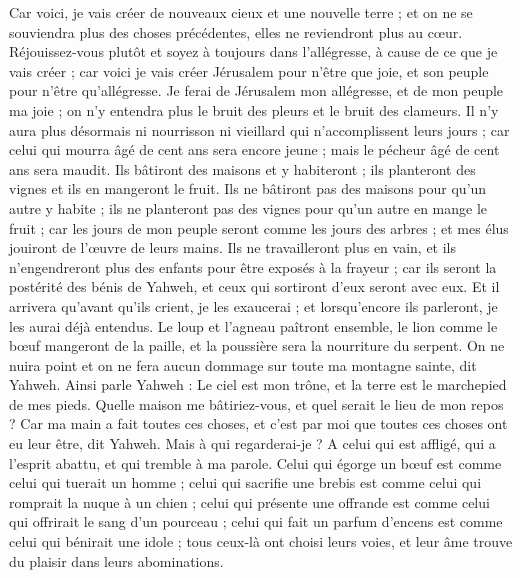 \begin{multicols}{2}
Car voici, je vais créer de nouveaux cieux et une nouvelle terre ; et on ne se souviendra plus des choses précédentes, elles ne reviendront plus au cœur.
Réjouissez-vous plutôt et soyez à toujours dans l'allégresse, à cause de ce que je vais créer ; car voici je vais créer Jérusalem pour n'être que joie, et son peuple pour n'être qu'allégresse.
Je ferai de Jérusalem mon allégresse, et de mon peuple ma joie ; on n'y entendra plus le bruit des pleurs et le bruit des clameurs.
Il n'y aura plus désormais ni nourrisson ni vieillard qui n'accomplissent leurs jours ; car celui qui mourra âgé de cent ans sera encore jeune ; mais le pécheur âgé de cent ans sera maudit.
Ils bâtiront des maisons et y habiteront ; ils planteront des vignes et ils en mangeront le fruit.
Ils ne bâtiront pas des maisons pour qu'un autre y habite ; ils ne planteront pas des vignes pour qu'un autre en mange le fruit ; car les jours de mon peuple seront comme les jours des arbres ; et mes élus jouiront de l'œuvre de leurs mains.
Ils ne travailleront plus en vain, et ils n'engendreront plus des enfants pour être exposés à la frayeur ; car ils seront la postérité des bénis de Yahweh, et ceux qui sortiront d'eux seront avec eux.
Et il arrivera qu'avant qu'ils crient, je les exaucerai ; et lorsqu'encore ils parleront, je les aurai déjà entendus.
Le loup et l'agneau paîtront ensemble, le lion comme le bœuf mangeront de la paille, et la poussière sera la nourriture du serpent. On ne nuira point et on ne fera aucun dommage sur toute ma montagne sainte, dit Yahweh.
\VerseOne{}Ainsi parle Yahweh : Le ciel est mon trône, et la terre est le marchepied de mes pieds. Quelle maison me bâtiriez-vous, et quel serait le lieu de mon repos ?
Car ma main a fait toutes ces choses, et c'est par moi que toutes ces choses ont eu leur être, dit Yahweh. Mais à qui regarderai-je ? A celui qui est affligé, qui a l'esprit abattu, et qui tremble à ma parole.
Celui qui égorge un bœuf est comme celui qui tuerait un homme ; celui qui sacrifie une brebis est comme celui qui romprait la nuque à un chien ; celui qui présente une offrande est comme celui qui offrirait le sang d'un pourceau ; celui qui fait un parfum d'encens est comme celui qui bénirait une idole ; tous ceux-là ont choisi leurs voies, et leur âme trouve du plaisir dans leurs abominations.

\end{multicols}
